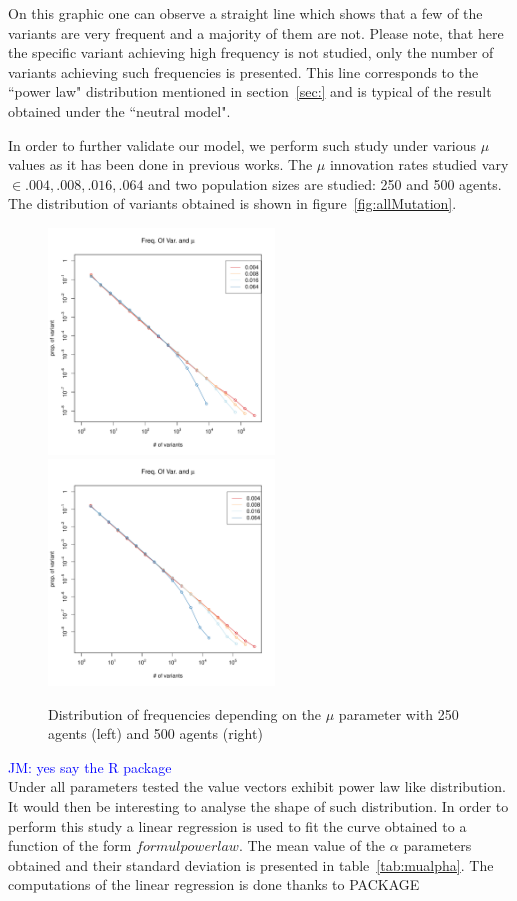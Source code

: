 \documentclass{wscpaperproc}
\newcommand{\memo}[2]{\textcolor{#1}{#2}}
\newcommand{\jm}[1]{\memo{blue}{JM: #1\\}}
\begin{document}
On this graphic one can observe a straight line which shows that a few of the variants are very frequent and a majority of them are not. Please note, that here the specific variant achieving high frequency is not studied, only the number of variants achieving such frequencies is presented. This line corresponds to the ``power law" distribution mentioned in section~\ref{sec:} and is typical of the result obtained under the ``neutral model". 

In order to further validate our model, we perform such study under various $\mu$ values as it has been done in previous works. The $\mu$ innovation rates studied vary $\in {.004,.008,.016,.064}$ and two population sizes are studied: 250 and 500 agents. The distribution of variants obtained is shown in figure~\ref{fig:allMutation}.

\begin{figure}[!hbp]
	\begin{center}
		\includegraphics[width=6cm]{img/allmuRandMaxN250.pdf}
		\includegraphics[width=6cm]{img/allmuRandMaxN500.pdf}
	\end{center}
	\caption{Distribution of frequencies depending on the $\mu$ parameter with 250 agents (left) and 500 agents (right)}
	\label{fig:allMutation }
\end{figure}

\jm{yes say the R package}
Under all parameters tested the value vectors exhibit power law like distribution. It would then be interesting to analyse the shape of such distribution. In order to perform this study a linear regression is used to fit the curve obtained to a function of the form $formul powerlaw$. The mean value of the $\alpha$ parameters obtained and their standard deviation is presented in table~\ref{tab:mualpha}. The computations of the linear regression is done thanks to PACKAGE
\end{document}
